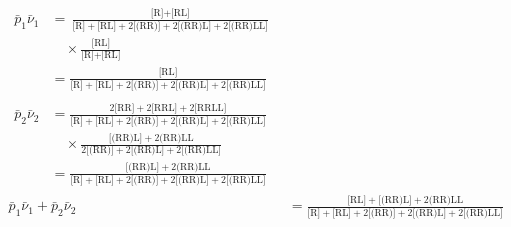 \begin{align}
	\begin{split}
	\bar{p}_1 \bar{\nu}_1& = \frac{\text{[R]} + \text{[RL]}}{\text{[R]} + \text{[RL]} + 2 \text{[(RR)]} + 2 \text{[(RR)L]} + 2 \text{[(RR)LL]}} \\[2ex]
	& \quad \times \frac{\text{[RL]}}{\text{[R]} + \text{[RL]}} \\[3ex]
	&= \frac{\text{[RL]}}{\text{[R]} + \text{[RL]} + 2 \text{[(RR)]} + 2 \text{[(RR)L]} + 2 \text{[(RR)LL]}}
	\end{split}
\\[3ex]
	\begin{split}
		\bar{p}_2 \bar{\nu}_2& = \frac{2 \text{[RR]} + 2 \text{[RRL]} + 2 \text{[RRLL]}}{\text{[R]} +  \text{[RL]} + 2 \text{[(RR)]} + 2 \text{[(RR)L]} + 2 \text{[(RR)LL]}} \\[2ex]
		& \quad \times \frac{\text{[(RR)L]} + 2 \text{(RR)LL}}{2 \text{[(RR)]} + 2 \text{[(RR)L]} + 2 \text{[(RR)LL}]} \\[3ex]
		&= \frac{\text{[(RR)L]} + 2 \text{(RR)LL}}{\text{[R]} +  \text{[RL]} + 2 \text{[(RR)]} + 2 \text{[(RR)L]} + 2 \text{[(RR)LL]}}
	\end{split}
\\[3ex]
\bar{p}_1 \bar{\nu}_1 + \bar{p}_2 \bar{\nu}_2& = \frac{\text{[RL]} + \text{[(RR)L]} + 2 \text{(RR)LL}}{\text{[R]} + \text{[RL]} + 2 \text{[(RR)]} + 2 \text{[(RR)L]} + 2 \text{[(RR)LL]}}
\end{align}


		




